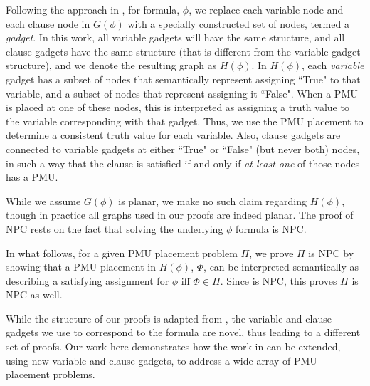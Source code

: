 Following the approach in \cite{Brueni05}, for \sat formula, $\phi$, we replace each variable node and each clause node in $G(\phi)$ with a specially constructed set of nodes,
termed a {\em gadget}. In this work, all variable gadgets will have the same structure, and all clause gadgets have the same structure (that is different from the variable gadget structure), and we denote the resulting graph as $H(\phi)$.
In $H(\phi)$, each {\em variable} gadget has a subset of nodes that semantically represent assigning ``True" to that variable, and a subset of nodes that represent assigning it ``False". When a PMU is placed at one of these nodes, this is interpreted as assigning 
a truth value to the \sat variable corresponding with that gadget. 
Thus, we use the PMU placement to determine a consistent truth value for each \sat variable. 
Also, clause gadgets are connected to variable gadgets at either ``True" or ``False" (but never both) nodes, in such a way that the clause is satisfied if and only if {\em at least one} of those nodes has a PMU.

While we assume $G(\phi)$ is planar, we make no such claim regarding $H(\phi)$, though in practice all graphs used in our proofs are indeed planar. The proof of NPC rests on the fact that solving the underlying $\phi$ formula is NPC.

In what follows, for a given PMU placement problem $\Pi$, we prove $\Pi$ is NPC by showing that a PMU placement in $H(\phi)$, $\Phi$, can be interpreted semantically as describing a satisfying assignment for $\phi$ iff $\Phi\in\Pi$. 
Since \sat is NPC, this proves $\Pi$ is  NPC as well.

While the structure of our proofs is adapted from \cite{Brueni05}, the variable and clause gadgets we use to correspond to the \sat formula are novel, thus leading to a 
different set of proofs. Our work here demonstrates how the work in \cite{Brueni05} can be extended, using new variable and clause gadgets, to address a wide array of PMU placement problems.




